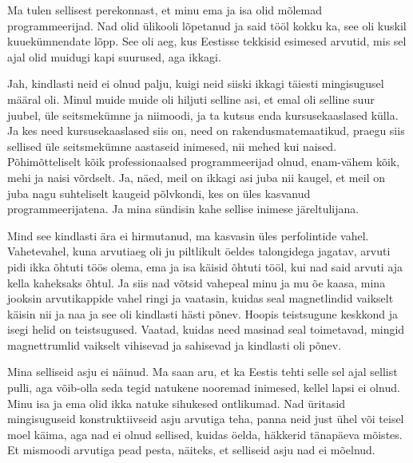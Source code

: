 Ma tulen sellisest perekonnast, et minu ema ja isa olid mõlemad 
programmeerijad. Nad olid  ülikooli lõpetanud ja  said tööl kokku ka, 
see oli kuskil kuuekümnendate lõpp. See oli  aeg, kus Eestisse tekkisid 
esimesed arvutid, mis sel ajal olid muidugi kapi suurused, aga ikkagi.


Jah, kindlasti neid ei olnud palju, kuigi neid siiski ikkagi täiesti 
mingisugusel määral oli. Minul muide muide oli hiljuti selline asi, et  emal 
oli selline suur juubel, üle seitsmekümne ja niimoodi, ja ta kutsus enda 
kursusekaaslased külla. Ja kes need kursusekaaslased siis on, need on 
rakendusmatemaatikud, praegu siis sellised üle seitsmekümne aastaseid  
inimesed, nii mehed kui naised. Põhimõtteliselt kõik  
professionaalsed programmeerijad olnud, enam-vähem kõik, mehi ja naisi 
võrdselt. Ja, näed, meil on ikkagi asi juba nii kaugel, et meil on juba nagu 
suhteliselt kaugeid põlvkondi, kes on üles kasvanud programmeerijatena. Ja mina 
sündisin kahe sellise inimese järeltulijana.


Mind see kindlasti ära ei hirmutanud, ma kasvasin üles perfolintide vahel. 
Vahetevahel, kuna arvutiaeg oli ju piltlikult öeldes talongidega 
jagatav, arvuti pidi ikka õhtuti töös olema, ema ja isa käisid 
õhtuti tööl, kui nad said arvuti aja kella kaheksaks õhtul. 
Ja siis nad võtsid vahepeal minu ja mu õe 
 kaasa, mina jooksin  arvutikappide vahel ringi ja vaatasin, kuidas seal 
magnetlindid vaikselt käisin nii ja naa ja see oli kindlasti hästi põnev. 
Hoopis teistsugune keskkond ja isegi helid on teistsugused. Vaatad, kuidas 
need masinad seal toimetavad, mingid magnettrumlid vaikselt vihisevad ja 
sahisevad ja kindlasti oli põnev.


Mina selliseid asju ei näinud. Ma saan aru, et ka Eestis  tehti selle sel ajal 
sellist  pulli, aga võib-olla  seda tegid natukene nooremad inimesed, kellel 
lapsi ei olnud. Minu isa ja ema olid ikka natuke sihukesed ontlikumad. Nad 
üritasid mingisuguseid konstruktiivseid asju arvutiga teha,  panna neid just 
ühel või teisel moel  käima, aga nad ei olnud sellised, kuidas öelda, häkkerid 
tänapäeva mõistes. Et  mismoodi arvutiga  pead pesta, näiteks, et selliseid 
asju nad ei mõelnud.

